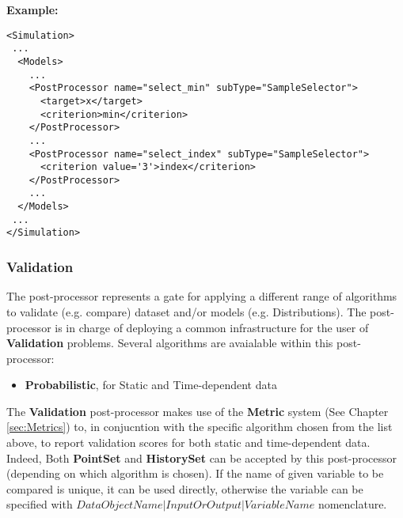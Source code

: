 \textbf{Example:}

\begin{lstlisting}[style=XML]
<Simulation>
 ...
  <Models>
    ...
    <PostProcessor name="select_min" subType="SampleSelector">
      <target>x</target>
      <criterion>min</criterion>
    </PostProcessor>
    ...
    <PostProcessor name="select_index" subType="SampleSelector">
      <criterion value='3'>index</criterion>
    </PostProcessor>
    ...
  </Models>
 ...
</Simulation>
\end{lstlisting}

\subsubsection{Validation}
\label{subsubsec:Validation}

The  post-processor represents a gate
for applying a different range of algorithms to validate (e.g. compare)
dataset and/or models (e.g. Distributions).
The post-processor is in charge of deploying a common infrastructure
for the user of  \textbf{Validation} problems.
Several algorithms are avaialable within this post-processor:
\begin{itemize}
  \item  \textbf{Probabilistic}, for Static and Time-dependent data
\end{itemize}
%

The \textbf{Validation} post-processor makes use of the \textbf{Metric} system (See Chapter \ref{sec:Metrics}) to, in conjucntion with the specific algorithm chosen from the list above,
to report validation scores for both static and time-dependent data.
Indeed, Both \textbf{PointSet} and \textbf{HistorySet} can be accepted by this post-processor (depending on which algorithm is chosen).
If the name of given variable to be compared is unique, it can be used directly, otherwise the variable can be specified
with $DataObjectName|InputOrOutput|VariableName$ nomenclature.

